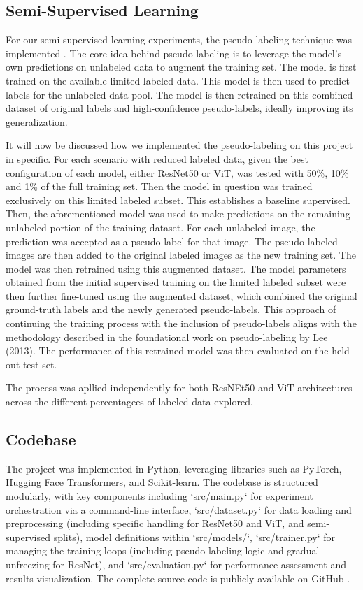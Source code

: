 \documentclass{article}
\begin{document}
\subsection{Semi-Supervised Learning}
For our semi-supervised learning experiments, the pseudo-labeling technique was implemented \cite{lee2013pseudo}. The core idea behind  pseudo-labeling is to leverage the model's own predictions on unlabeled data to augment the training set. The model is first trained on the available limited labeled data. This model is then used to predict labels for the unlabeled data pool. The model is then retrained on this combined dataset of original labels and high-confidence pseudo-labels, ideally improving its generalization. 

It will now be discussed how we implemented the pseudo-labeling on this project in specific. For each scenario with reduced labeled data, given the best configuration of each model, either ResNet50 or ViT, was tested with 50\%, 10\% and 1\% of the full training set. Then the model in question was trained exclusively on this limited labeled subset. This establishes a baseline supervised. Then, the aforementioned model was used to make predictions on the remaining unlabeled portion of the training dataset. For each unlabeled image, the prediction was accepted as a pseudo-label for that image. The pseudo-labeled images are then added to the original labeled images as the new training set. The model was then retrained using this augmented dataset. The model parameters obtained from the initial supervised training on the limited labeled subset were then further fine-tuned using the augmented dataset, which combined the original ground-truth labels and the newly generated pseudo-labels. This approach of continuing the training process with the inclusion of pseudo-labels aligns with the methodology described in the foundational work on pseudo-labeling by Lee (2013)\cite{lee2013pseudo}. The performance of this retrained model was then evaluated on the held-out test set.  

The process was apllied independently for both ResNEt50 and ViT architectures across the different percentagees of labeled data explored. 

\subsection{Codebase}
The project was implemented in Python, leveraging libraries such as PyTorch, Hugging Face Transformers, and Scikit-learn. The codebase is structured modularly, with key components including `src/main.py` for experiment orchestration via a command-line interface, `src/dataset.py` for data loading and preprocessing (including specific handling for ResNet50 and ViT, and semi-supervised splits), model definitions within `src/models/`, `src/trainer.py` for managing the training loops (including pseudo-labeling logic and gradual unfreezing for ResNet), and `src/evaluation.py` for performance assessment and results visualization. The complete source code is publicly available on GitHub \cite{OurProject}.
\end{document}
